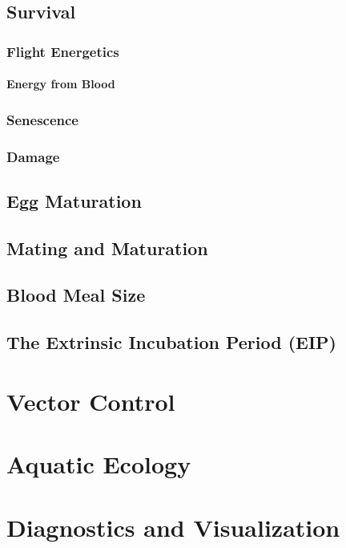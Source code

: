 \documentclass{article}
\begin{document}
\subsection{Survival}

\subsubsection{Flight Energetics}

\paragraph{Energy from Blood}

\subsubsection{Senescence}

\subsubsection{Damage}

\subsection{Egg Maturation}

\subsection{Mating and Maturation}

\subsection{Blood Meal Size}

\subsection{The Extrinsic Incubation Period (EIP)}

\section{Vector Control}

\section{Aquatic Ecology}

\section{Diagnostics and Visualization}
\end{document}
